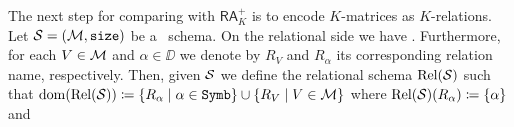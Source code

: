 The next step for comparing \langsum with $\mathsf{RA}_{K}^+$  is to encode $K$-matrices as $K$-relations.
Let $\mathcal{S}=(\mathcal{M},\texttt{size})$ be a \lang\ schema. On the relational side
we have . Furthermore, for each $V\in\mathcal{M}$ and $\alpha \in \DD$ we denote
by $R_V$ and $R_\alpha$ its corresponding relation name, respectively. Then, given $\mathcal{S}$ we define the relational schema $\text{Rel}(\mathcal{S})$ such that $\operatorname{dom}(\text{Rel}(\mathcal{S}))\coloneqq   \{R_\alpha \mid \alpha\in\texttt{Symb}\} \cup \{R_V \mid V \in \mathcal{M}\}$ where $\text{Rel}(\mathcal{S})(R_\alpha)\coloneqq  \{\alpha\}$ and

